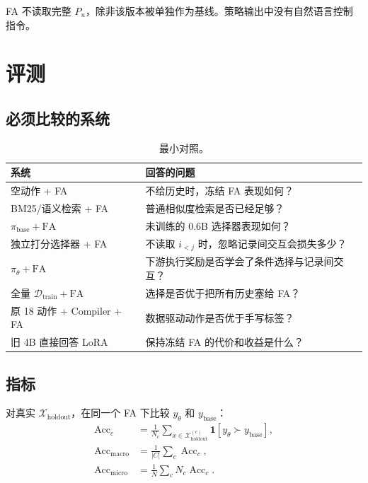 \documentclass[11pt,UTF8,fontset=none]{ctexart}
\newcommand{\Dtrain}{\mathcal D_{\mathrm{train}}}
\newcommand{\Xholdout}{\mathcal X_{\mathrm{holdout}}}
\newcommand{\policy}{\pi_{\theta}}
\newcommand{\basepolicy}{\pi_{\mathrm{base}}}
\newcommand{\FA}{\mathrm{FA}}
\begin{document}
FA 不读取完整 \(P_u\)，除非该版本被单独作为基线。策略输出中没有自然语言控制指令。

\section{评测}

\subsection{必须比较的系统}

\begin{table}[ht]
  \centering
  \caption{最小对照。}
  \begin{tabularx}{\textwidth}{@{}L{0.31\textwidth}Y@{}}
    \toprule
    系统 & 回答的问题 \\
    \midrule
    空动作 + FA &
    不给历史时，冻结 FA 表现如何？ \\
    BM25/语义检索 + FA &
    普通相似度检索是否已经足够？ \\
    \(\basepolicy+\FA\) &
    未训练的 0.6B 选择器表现如何？ \\
    独立打分选择器 + FA &
    不读取 \(i_{<j}\) 时，忽略记录间交互会损失多少？ \\
    \(\policy+\FA\) &
    下游执行奖励是否学会了条件选择与记录间交互？ \\
    全量 \(\Dtrain+\FA\) &
    选择是否优于把所有历史塞给 FA？ \\
    原 18 动作 + Compiler + FA &
    数据驱动动作是否优于手写标签？ \\
    旧 4B 直接回答 LoRA &
    保持冻结 FA 的代价和收益是什么？ \\
    \bottomrule
  \end{tabularx}
\end{table}

\subsection{指标}

对真实 \(\Xholdout\)，在同一个 FA 下比较 \(y_{\theta}\) 和
\(y_{\mathrm{base}}\)：
\begin{align}
  \operatorname{Acc}_c
  &=
  \frac{1}{N_c}
  \sum_{x\in\Xholdout^{(c)}}
  \mathbf 1[y_{\theta}\succ y_{\mathrm{base}}],\\
  \operatorname{Acc}_{\mathrm{macro}}
  &=
  \frac{1}{|C|}
  \sum_c\operatorname{Acc}_c,\\
  \operatorname{Acc}_{\mathrm{micro}}
  &=
  \frac{1}{N}
  \sum_c N_c\operatorname{Acc}_c.
\end{align}
\end{document}
